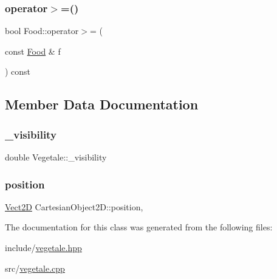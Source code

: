 \mbox{\label{classFood_a8f2ac4d8b5434d35947b038390fab95d_a8f2ac4d8b5434d35947b038390fab95d}} 
\subsubsection{\texorpdfstring{operator$>$=()}{operator>=()}}
{\footnotesize\ttfamily bool Food\+::operator$>$= (\begin{DoxyParamCaption}\item[{const \hyperlink{classFood}{Food} \&}]{f }\end{DoxyParamCaption}) const\hspace{0.3cm}{\ttfamily [inherited]}}



\subsection{Member Data Documentation}
\mbox{\label{classVegetale_afeead5953c496ba59f5f9201bc29c86f_afeead5953c496ba59f5f9201bc29c86f}} 
\subsubsection{\texorpdfstring{\+\_\+visibility}{\_visibility}}
{\footnotesize\ttfamily double Vegetale\+::\+\_\+visibility\hspace{0.3cm}{\ttfamily [private]}}

\mbox{\label{classCartesianObject2D_ae02ec6ed11f9bfc0c748da033d6a32f9_ae02ec6ed11f9bfc0c748da033d6a32f9}} 
\subsubsection{\texorpdfstring{position}{position}}
{\footnotesize\ttfamily \hyperlink{classVect2D}{Vect2D} Cartesian\+Object2\+D\+::position\hspace{0.3cm}{\ttfamily [protected]}, {\ttfamily [inherited]}}



The documentation for this class was generated from the following files\+:\begin{DoxyCompactItemize}
\item 
include/\hyperlink{vegetale_8hpp}{vegetale.\+hpp}\item 
src/\hyperlink{vegetale_8cpp}{vegetale.\+cpp}\end{DoxyCompactItemize}
